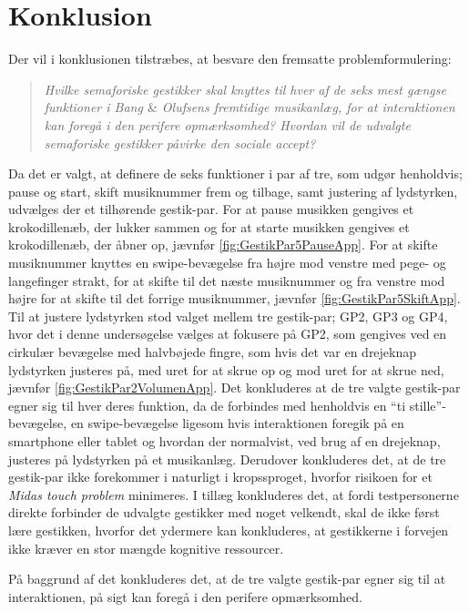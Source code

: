 \chapter{Konklusion}
\label{Konklusion}
%
Der vil i konklusionen tilstræbes, at besvare den fremsatte problemformulering: 
%
\begin{quotation}
	\noindent
	\textit{Hvilke semaforiske gestikker skal knyttes til hver af de seks mest gængse funktioner i Bang $\&$ Olufsens fremtidige musikanlæg, for at interaktionen kan foregå i den perifere opmærksomhed?\blankline
		Hvordan vil de udvalgte semaforiske gestikker påvirke den sociale accept?}\blankline
\end{quotation}
%
Da det er valgt, at definere de seks funktioner i par af tre, som udgør henholdvis; pause og start, skift musiknummer frem og tilbage, samt justering af lydstyrken, udvælges der et tilhørende gestik-par. For at pause musikken gengives et krokodillenæb, der lukker sammen og for at starte musikken gengives et krokodillenæb, der åbner op, jævnfør \autoref{fig:GestikPar5PauseApp}. For at skifte musiknummer knyttes en swipe-bevægelse fra højre mod venstre med pege- og langefinger strakt, for at skifte til det næste musiknummer og fra venstre mod højre for at skifte til det forrige musiknummer, jævnfør \autoref{fig:GestikPar5SkiftApp}. Til at justere lydstyrken stod valget mellem tre gestik-par; GP2, GP3 og GP4, hvor det i denne undersøgelse vælges at fokusere på GP2, som gengives ved en cirkulær bevægelse med halvbøjede fingre, som hvis det var en drejeknap lydstyrken justeres på, med uret for at skrue op og mod uret for at skrue ned, jævnfør \autoref{fig:GestikPar2VolumenApp}. Det konkluderes at de tre valgte gestik-par egner sig til hver deres funktion, da de forbindes med henholdvis en \enquote{ti stille}-bevægelse, en swipe-bevægelse ligesom hvis interaktionen foregik på en smartphone eller tablet og hvordan der normalvist, ved brug af en drejeknap, justeres på lydstyrken på et musikanlæg. Derudover konkluderes det, at de tre gestik-par ikke forekommer i naturligt i kropssproget, hvorfor risikoen for et \textit{Midas touch problem} minimeres. I tillæg konkluderes det, at fordi testpersonerne direkte forbinder de udvalgte gestikker med noget velkendt, skal de ikke først lære gestikken, hvorfor det ydermere kan konkluderes, at gestikkerne i forvejen ikke kræver en stor mængde kognitive ressourcer. 

På baggrund af det konkluderes det, at de tre valgte gestik-par egner sig til at interaktionen, på sigt kan foregå i den perifere opmærksomhed.   



